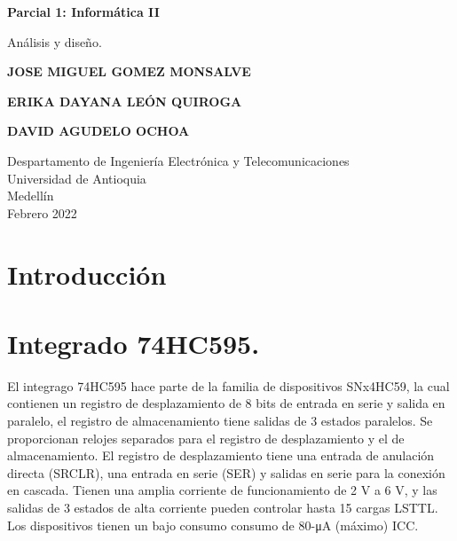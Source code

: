\documentclass{article}
\begin{document}
\begin{titlepage}
    \begin{center}
        \vspace*{1cm}
            
        \Huge
        \textbf{Parcial 1: Informática II}
            
        \vspace{0.5cm}
        \LARGE
       Análisis y diseño.
          
            
        \vspace{6cm}
        
        \textbf{JOSE MIGUEL GOMEZ MONSALVE}
        
        \vspace{0.5cm}
        
        \textbf{ERIKA DAYANA LEÓN QUIROGA}
        
        \vspace{0.5cm}
        
        \textbf{DAVID AGUDELO OCHOA}
            

            
        \vfill
            
        \vspace{0.8cm}
       
        \Large


        \vfill
        Despartamento de Ingeniería Electrónica y Telecomunicaciones\\
        Universidad de Antioquia\\
        Medellín\\
        Febrero 2022
                 
    \end{center}
\end{titlepage}

\tableofcontents\newpage
\section{Introducción}
\noindent

\newpage

\section{Integrado 74HC595.} \label{Integrado}
El integrago 74HC595 hace parte de la familia de dispositivos SNx4HC59, la cual contienen un registro de desplazamiento de 8 bits de entrada en serie y salida en paralelo, el registro de almacenamiento tiene salidas de 3 estados paralelos. Se proporcionan relojes separados para el registro de desplazamiento y el de almacenamiento. El registro de desplazamiento tiene una entrada de anulación directa (SRCLR), una entrada en serie (SER) y salidas en serie para la conexión en cascada. Tienen una amplia corriente de funcionamiento de 2 V a 6 V, y las salidas de 3 estados de alta corriente pueden controlar hasta 15 cargas LSTTL. Los dispositivos tienen un bajo consumo consumo de 80-μA (máximo) ICC.
\end{document}
